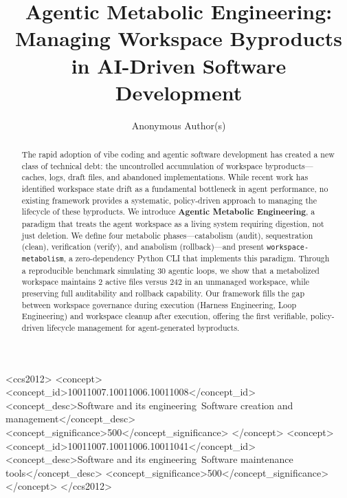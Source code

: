 \documentclass[sigconf,anonymous]{acmart}
\author{Anonymous Author(s)}
\affiliation{\institution{Anonymous Institution}}
\begin{document}
\title{Agentic Metabolic Engineering: Managing Workspace Byproducts in AI-Driven Software Development}

\begin{abstract}
The rapid adoption of vibe coding and agentic software development has created a new class of technical debt: the uncontrolled accumulation of workspace byproducts---caches, logs, draft files, and abandoned implementations. While recent work has identified workspace state drift as a fundamental bottleneck in agent performance, no existing framework provides a systematic, policy-driven approach to managing the lifecycle of these byproducts. We introduce \textbf{Agentic Metabolic Engineering}, a paradigm that treats the agent workspace as a living system requiring digestion, not just deletion. We define four metabolic phases---catabolism (audit), sequestration (clean), verification (verify), and anabolism (rollback)---and present \texttt{workspace-metabolism}, a zero-dependency Python CLI that implements this paradigm. Through a reproducible benchmark simulating 30 agentic loops, we show that a metabolized workspace maintains 2 active files versus 242 in an unmanaged workspace, while preserving full auditability and rollback capability. Our framework fills the gap between workspace governance during execution (Harness Engineering, Loop Engineering) and workspace cleanup after execution, offering the first verifiable, policy-driven lifecycle management for agent-generated byproducts.
\end{abstract}

\begin{CCSXML}
<ccs2012>
<concept>
<concept_id>10011007.10011006.10011008</concept_id>
<concept_desc>Software and its engineering~Software creation and management</concept_desc>
<concept_significance>500</concept_significance>
</concept>
<concept>
<concept_id>10011007.10011006.10011041</concept_id>
<concept_desc>Software and its engineering~Software maintenance tools</concept_desc>
<concept_significance>500</concept_significance>
</concept>
</ccs2012>
\end{CCSXML}


\maketitle
\end{document}
